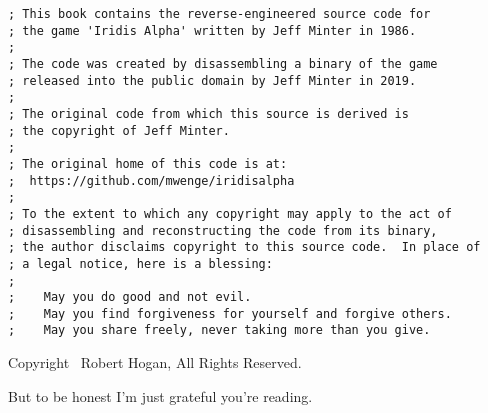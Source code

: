 \clearpage
\lstset{style=6502Style}

\begin{lstlisting}
; This book contains the reverse-engineered source code for 
; the game 'Iridis Alpha' written by Jeff Minter in 1986.
;
; The code was created by disassembling a binary of the game
; released into the public domain by Jeff Minter in 2019.
;
; The original code from which this source is derived is 
; the copyright of Jeff Minter.
;
; The original home of this code is at: 
;  https://github.com/mwenge/iridisalpha
;
; To the extent to which any copyright may apply to the act of 
; disassembling and reconstructing the code from its binary, 
; the author disclaims copyright to this source code.  In place of
; a legal notice, here is a blessing:
;
;    May you do good and not evil.
;    May you find forgiveness for yourself and forgive others.
;    May you share freely, never taking more than you give.
\end{lstlisting}

\vspace*{\fill}
Copyright \textcopyright\ Robert Hogan, All Rights Reserved.

\doclicenseThis

But to be honest I'm just grateful you're reading.
\clearpage
